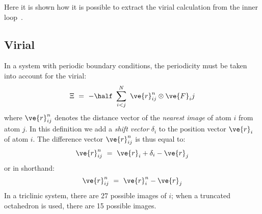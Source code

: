 Here it is shown how it is possible to extract the virial calculation
from the inner loop~\cite{Bekker93b}.

\subsection{Virial}
In a system with periodic boundary conditions, the
periodicity must be taken into account for the virial:
\begin{equation}
\Xi~=~-\half~\sum_{i < j}^{N}~\ve{r}_{ij}^n\otimes\ve{F}_ij
\end{equation}
where $\ve{r}_{ij}^n$ denotes the distance vector of the
{\em nearest image} of atom $i$ from atom $j$. In this definition we add
a {\em shift vector} $\delta_i$ to the position vector $\ve{r}_i$ 
of atom $i$. The difference vector $\ve{r}_{ij}^n$ is thus equal to:
\begin{equation}
\ve{r}_{ij}^n~=~\ve{r}_i+\delta_i-\ve{r}_j
\end{equation}
or in shorthand:
\begin{equation}
\ve{r}_{ij}^n~=~\ve{r}_i^n-\ve{r}_j
\end{equation}
In a triclinic system, there are 27 possible images of $i$; when a truncated 
octahedron is used, there are 15 possible images.

